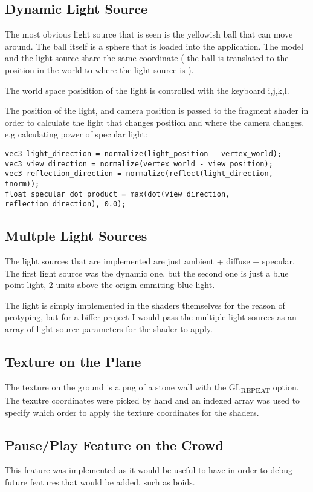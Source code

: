 \documentclass[11pt]{article}
\begin{document}
\subsection*{Dynamic Light Source}
\label{sec:orgffe19ad}
The most obvious light source that is seen is the yellowish ball that can move around.   
The ball itself is a sphere that is loaded into the application. The model and the light source
share the same coordinate ( the ball is translated to the position in the world to where the light 
source is ).   

The world space posisition of the light is controlled with the keyboard i,j,k,l.   

The position of the light, and camera position is passed to the fragment shader in order to calculate the light
that changes position and where the camera changes.   
e.g calculating power of specular light:
\begin{verbatim}
vec3 light_direction = normalize(light_position - vertex_world);
vec3 view_direction = normalize(vertex_world - view_position);                      
vec3 reflection_direction = normalize(reflect(light_direction, tnorm));            
float specular_dot_product = max(dot(view_direction, reflection_direction), 0.0);  
\end{verbatim}

\subsection*{Multple Light Sources}
\label{sec:org50c5859}
The light sources that are implemented are just ambient + diffuse + specular.   
The first light source was the dynamic one, but the second one is just a blue point light, 2 units 
above the origin emmiting blue light.   

The light is simply implemented in the shaders themselves for the reason of protyping, but for a biffer project I
would pass the multiple light sources as an array of light source parameters for the shader to apply.
\subsection*{Texture on the Plane}
\label{sec:org33b09bb}
The texture on the ground is a png of a stone wall with the GL\textsubscript{REPEAT} option.
The texutre coordinates were picked by hand and an indexed array was used to specify which order 
to apply the texture coordinates for the shaders.   

\subsection*{Pause/Play Feature on the Crowd}
\label{sec:org4f49a5d}
This feature was implemented as it would be useful to have in order to debug future features that would be added, such 
as boids.   
\end{document}
